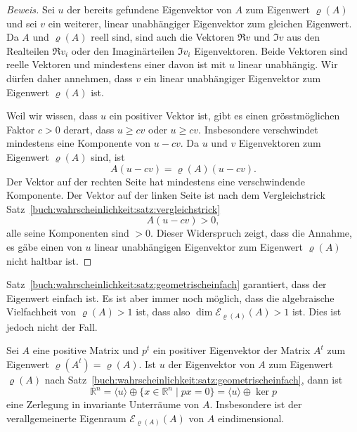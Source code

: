 \begin{proof}[Beweis]
Sei $u$ der bereits gefundene Eigenvektor von $A$ zum Eigenwert $\varrho(A)$
und sei $v$ ein weiterer, linear unabhängiger Eigenvektor zum
gleichen Eigenwert.
Da $A$ und $\varrho(A)$ reell sind, sind auch die Vektoren $\Re v$ und $\Im v$
aus den Realteilen $\Re v_i$ oder den Imaginärteilen $\Im v_i$ Eigenvektoren.
Beide Vektoren sind reelle Vektoren und mindestens einer davon ist mit
$u$ linear unabhängig.
Wir dürfen daher annehmen, dass $v$ ein linear unabhängiger Eigenvektor
zum Eigenwert $\varrho(A)$ ist.

Weil wir wissen, dass $u$ ein positiver Vektor ist, gibt es einen
grösstmöglichen Faktor $c>0$ derart, dass $u\ge cv$ oder $u\ge cv$.
Insbesondere verschwindet mindestens eine Komponente von $u-cv$.
Da $u$ und $v$ Eigenvektoren zum Eigenwert $\varrho(A)$ sind,
ist 
\[
A(u-cv)
=
\varrho(A)(u-cv).
\]
Der Vektor auf der rechten Seite hat mindestens eine verschwindende 
Komponente.
Der Vektor auf der linken Seite ist nach dem Vergleichstrick
Satz~\ref{buch:wahrscheinlichkeit:satz:vergleichstrick}
\[
A(u-cv) > 0,
\]
alle seine Komponenten sind $>0$.
Dieser Widerspruch zeigt, dass die Annahme, es gäbe einen von $u$ linear 
unabhängigen Eigenvektor zum Eigenwert $\varrho(A)$ nicht haltbar ist.
\end{proof}

Satz~\ref{buch:wahrscheinlichkeit:satz:geometrischeinfach} garantiert,
dass der Eigenwert einfach ist.
Es ist aber immer noch möglich, dass die algebraische Vielfachheit
von $\varrho(A) >1$ ist, dass also $\dim\mathcal{E}_{\varrho(A)}(A)>1$
ist.
Dies ist jedoch nicht der Fall.

\begin{satz}
\label{buch:wahrscheinlichkeit:satz:algebraischeinfach}
Sei $A$ eine positive Matrix und $p^t$ ein positiver Eigenvektor
der Matrix $A^t$ zum Eigenwert $\varrho(A^t)=\varrho(A)$.
Ist $u$ der Eigenvektor von $A$ zum Eigenwert $\varrho(A)$ nach
Satz~\ref{buch:wahrscheinlichkeit:satz:geometrischeinfach},
dann ist
\[
\mathbb{R}^n
=
\langle u\rangle
\oplus
\{ x\in\mathbb{R}^n \mid px=0\}
=
\langle u\rangle
\oplus
\ker p
\]
eine Zerlegung in invariante Unterräume von $A$.
Insbesondere ist der verallgemeinerte Eigenraum $\mathcal{E}_{\varrho(A)}(A)$
von $A$ eindimensional.
\end{satz}

